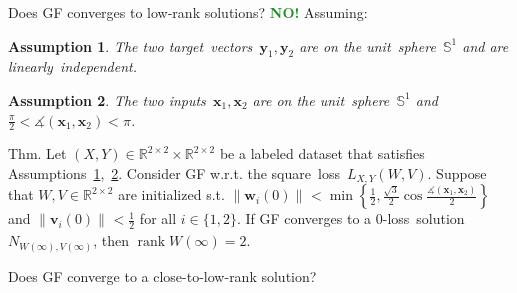 \documentclass[handout,usenames,dvipsnames]{beamer} %
\DeclareMathOperator{\rank}{rank}
\newtheorem{assumption}{Assumption}
\newcommand{\norm}[2][]{{\left\|{#2}\right\|_{#1}}}
\newcommand{\bx}{\mathbf{x}}
\newcommand{\bw}{\mathbf{w}}
\newcommand{\bv}{\mathbf{v}}
\newcommand{\by}{\mathbf{y}}
\newcommand{\reals}{{\mathbb R}}
\newcommand{\true}[1]{{\textcolor{ForestGreen}{\textbf{#1}}}}
\begin{document}
\begin{frame}
    Does GF converges to low-rank solutions? \true{NO!}
    \pause
    Assuming:
    \pause
    \begin{assumption}\label{assumption:ys_linearly_independent}
        The two target~vectors~$\by_1, \by_2$ are on the unit~sphere~$\mathbb{S}^1$ and are linearly~independent.
    \end{assumption}
    \pause
    \begin{assumption}\label{assumption:xs_bounded_angle}
        The two inputs~$\bx_1, \bx_2$ are on the unit~sphere~$\mathbb{S}^1$ and $\frac{\pi}{2} < \measuredangle(\bx_1, \bx_2) < \pi$.
    \end{assumption}
    \pause
    \begin{exampleblock}{Thm. \hfill\checkmark}\label{T2}
        Let $(X,Y) \in \mathbb{R}^{2 \times 2} \times \mathbb{R}^{2 \times 2}$ be a labeled dataset that satisfies Assumptions~\ref{assumption:ys_linearly_independent},~\ref{assumption:xs_bounded_angle}.
        Consider GF w.r.t. the square~loss~$L_{X,Y}(W,V)$. Suppose that $W,V \in \reals^{2 \times 2}$ are initialized s.t. 
        $\norm{\bw_i(0)} < \min \left\{ \frac{1}{2}, \frac{\sqrt{3}}{2} \cos{\frac{\measuredangle(\bx_1, \bx_2)}{2}} \right\}$ 
        and $\norm{\bv_i(0)} < \frac{1}{2}$ for all $i \in \{1,2\}$. If GF converges to a $0$-loss~solution~$N_{W(\infty),V(\infty)}$, then $\rank W(\infty) = 2$.
    \end{exampleblock}
    \pause
    Does GF converge to a \alert{close-to-low-rank} solution?
    

\end{frame}
\end{document}
